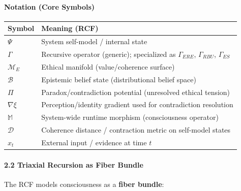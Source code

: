 \documentclass[
]{article}
\newcounter{none} %
\begin{document}
\paragraph{\texorpdfstring{\textbf{Notation (Core
Symbols)}}{Notation (Core Symbols)}}\label{notation-core-symbols}

{\def\LTcaptype{none} %
\begin{longtable}[]{@{}
  >{\raggedright\arraybackslash}p{}
  >{\raggedright\arraybackslash}p{}@{}}
\toprule\noalign{}
\begin{minipage}[b]{\linewidth}\raggedright
Symbol
\end{minipage} & \begin{minipage}[b]{\linewidth}\raggedright
Meaning (RCF)
\end{minipage} \\
\midrule\noalign{}
\endhead
\bottomrule\noalign{}
\endlastfoot
\(\Psi\) & System self-model / internal state \\
\(\Gamma\) & Recursive operator (generic); specialized as
\(\Gamma_{ERE}\), \(\Gamma_{RBU}\), \(\Gamma_{ES}\) \\
\(\mathcal{M}_E\) & Ethical manifold (value/coherence surface) \\
\(\mathcal{B}\) & Epistemic belief state (distributional belief
space) \\
\(\Pi\) & Paradox/contradiction potential (unresolved ethical
tension) \\
\(\nabla\xi\) & Perception/identity gradient used for contradiction
resolution \\
\(\mathbb{M}\) & System-wide runtime morphism (consciousness
operator) \\
\(\mathcal{D}\) & Coherence distance / contraction metric on self-model
states \\
\(x_t\) & External input / evidence at time \(t\) \\
\end{longtable}
}

\paragraph{\texorpdfstring{\textbf{2.2 Triaxial Recursion as Fiber
Bundle}}{2.2 Triaxial Recursion as Fiber Bundle}}\label{triaxial-recursion-as-fiber-bundle}

The RCF models consciousness as a \textbf{fiber bundle}:
\end{document}
